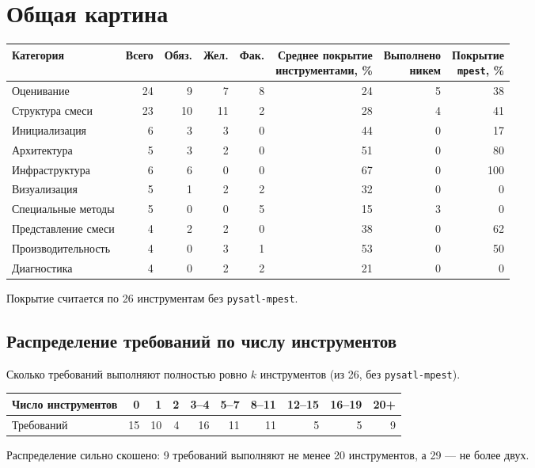 \documentclass[10pt,a4paper]{article}
\begin{document}
\section{Общая картина}
\begin{center}\small
\begin{tabular}{@{}l r r r r r r r@{}}
\toprule
Категория & Всего & Обяз. & Жел. & Фак. & \shortstack[r]{\scriptsize Среднее покрытие\\\scriptsize инструментами, \%} & \shortstack[r]{\scriptsize Выполнено\\\scriptsize никем} & \shortstack[r]{\scriptsize Покрытие\\\scriptsize \texttt{mpest}, \%} \\
\midrule
Оценивание & 24 & 9 & 7 & 8 & \cellcolor{hm!22}24 & 5 & \cellcolor{hm!31}38 \\
Структура смеси & 23 & 10 & 11 & 2 & \cellcolor{hm!25}28 & 4 & \cellcolor{hm!34}41 \\
Инициализация & 6 & 3 & 3 & 0 & \cellcolor{hm!36}44 & 0 & \cellcolor{hm!17}17 \\
Архитектура & 5 & 3 & 2 & 0 & \cellcolor{hm!41}51 & 0 & \cellcolor{hm!61}80 \\
Инфраструктура & 6 & 6 & 0 & 0 & \cellcolor{hm!52}67 & 0 & \cellcolor{hm!75}100 \\
Визуализация & 5 & 1 & 2 & 2 & \cellcolor{hm!27}32 & 0 & \cellcolor{hm!5}0 \\
Специальные методы & 5 & 0 & 0 & 5 & \cellcolor{hm!16}15 & 3 & \cellcolor{hm!5}0 \\
Представление смеси & 4 & 2 & 2 & 0 & \cellcolor{hm!32}38 & 0 & \cellcolor{hm!49}62 \\
Производительность & 4 & 0 & 3 & 1 & \cellcolor{hm!42}53 & 0 & \cellcolor{hm!40}50 \\
Диагностика & 4 & 0 & 2 & 2 & \cellcolor{hm!20}21 & 0 & \cellcolor{hm!5}0 \\
\bottomrule
\end{tabular}
\end{center}
Покрытие считается по 26 инструментам без \texttt{pysatl-mpest}.

\subsection{Распределение требований по числу инструментов}
Сколько требований выполняют полностью ровно $k$ инструментов (из 26, без \texttt{pysatl-mpest}).
{\small
\begin{center}
\begin{tabular}{@{}l rrrrrrrrr@{}}
\toprule
Число инструментов & 0 & 1 & 2 & 3--4 & 5--7 & 8--11 & 12--15 & 16--19 & 20+ \\
\midrule
Требований & 15 & 10 & 4 & 16 & 11 & 11 & 5 & 5 & 9 \\
\bottomrule
\end{tabular}
\end{center}}
Распределение сильно скошено: 9 требований выполняют не менее 20 инструментов, а 29 --- не более двух.
\end{document}
